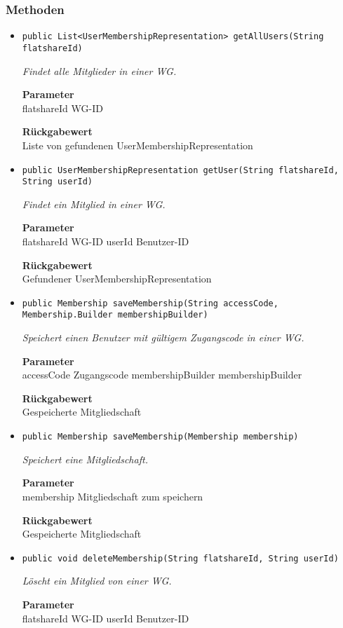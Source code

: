     \subsubsection*{Methoden}
    \begin{itemize}
    	\item{\texttt{public List<UserMembershipRepresentation> getAllUsers(String flatshareId)}}
    	
    	\textit{Findet alle Mitglieder in einer WG.}
    	
    	\textbf{Parameter} \\
    	flatshareId WG-ID
    	
    	\textbf{Rückgabewert} \\
    	Liste von gefundenen UserMembershipRepresentation        \item{\texttt{public UserMembershipRepresentation getUser(String flatshareId, String userId)}}
    	
    	\textit{Findet ein Mitglied in einer WG.}
    	
    	\textbf{Parameter} \\
    	flatshareId WG-ID
    	userId Benutzer-ID
    	
    	\textbf{Rückgabewert} \\
    	Gefundener UserMembershipRepresentation        \item{\texttt{public Membership saveMembership(String accessCode, Membership.Builder membershipBuilder)}}
    	
    	\textit{Speichert einen Benutzer mit gültigem Zugangscode in einer WG.}
    	
    	\textbf{Parameter} \\
    	accessCode Zugangscode
    	membershipBuilder membershipBuilder
    	
    	\textbf{Rückgabewert} \\
    	Gespeicherte Mitgliedschaft        \item{\texttt{public Membership saveMembership(Membership membership)}}
    	
    	\textit{Speichert eine Mitgliedschaft.}
    	
    	\textbf{Parameter} \\
    	membership Mitgliedschaft zum speichern
    	
    	\textbf{Rückgabewert} \\
    	Gespeicherte Mitgliedschaft        \item{\texttt{public void deleteMembership(String flatshareId, String userId)}}
    	
    	\textit{Löscht ein Mitglied von einer WG.}
    	
    	\textbf{Parameter} \\
    	flatshareId WG-ID
    	userId Benutzer-ID
    	
    	
    \end{itemize}
